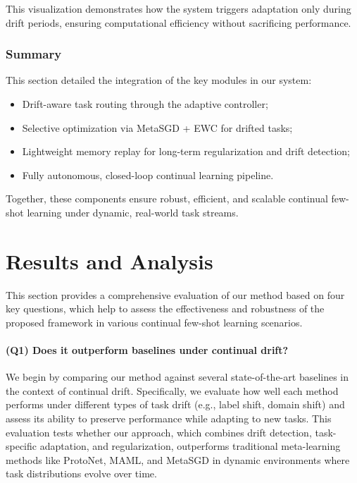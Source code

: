 \documentclass[conference]{IEEEtran}
\begin{document}
This visualization demonstrates how the system triggers adaptation only during drift periods, ensuring computational efficiency without sacrificing performance.

\subsubsection*{Summary}

This section detailed the integration of the key modules in our system:
\begin{itemize}
    \item Drift-aware task routing through the adaptive controller;
    \item Selective optimization via MetaSGD + EWC for drifted tasks;
    \item Lightweight memory replay for long-term regularization and drift detection;
    \item Fully autonomous, closed-loop continual learning pipeline.
\end{itemize}

Together, these components ensure robust, efficient, and scalable continual few-shot learning under dynamic, real-world task streams.


\section{Results and Analysis}

This section provides a comprehensive evaluation of our method based on four key questions, which help to assess the effectiveness and robustness of the proposed framework in various continual few-shot learning scenarios.

\paragraph{(Q1) Does it outperform baselines under continual drift?}  
We begin by comparing our method against several state-of-the-art baselines in the context of continual drift. Specifically, we evaluate how well each method performs under different types of task drift (e.g., label shift, domain shift) and assess its ability to preserve performance while adapting to new tasks. This evaluation tests whether our approach, which combines drift detection, task-specific adaptation, and regularization, outperforms traditional meta-learning methods like ProtoNet, MAML, and MetaSGD in dynamic environments where task distributions evolve over time.
\end{document}
